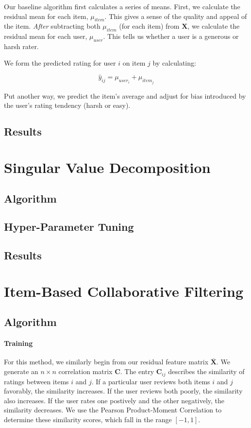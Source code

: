 \documentclass[12pt]{article}
\begin{document}
Our baseline algorithm first calculates a series of means. First, we calculate the residual mean for each item, $\mu_{item}$. This gives a sense of the quality and appeal of the item. \textit{After} subtracting both $\mu_{item}$ (for each item) from $\mathbf{X}$, we calculate the residual mean for each user, $\mu_{user}$. This tells us whether a user is a generous or harsh rater.

We form the predicted rating for user $i$ on item $j$ by calculating:

$$\hat y_{ij} = \mu_{user_i} + \mu_{item_j}$$

Put another way, we predict the item's average and adjust for bias introduced by the user's rating tendency (harsh or easy).

\subsection{Results}

\section{Singular Value Decomposition}

\subsection{Algorithm}
\subsection{Hyper-Parameter Tuning}
\subsection{Results}

\section{Item-Based Collaborative Filtering}

\subsection{Algorithm}
\paragraph{Training} For this method, we similarly begin from our residual feature matrix $\mathbf{\bar X}$. We generate an $n \times n$ correlation matrix $\mathbf{C}$. The entry $\mathbf{C}_{ij}$ describes the similarity of ratings between items $i$ and $j$. If a particular user reviews both items $i$ and $j$ favorably, the similarity increases. If the user reviews both poorly, the similarity also increases. If the user rates one postively and the other negatively, the similarity decreases. We use the Pearson Product-Moment Correlation to determine these similarity scores, which fall in the range $[-1, 1]$.
\end{document}
